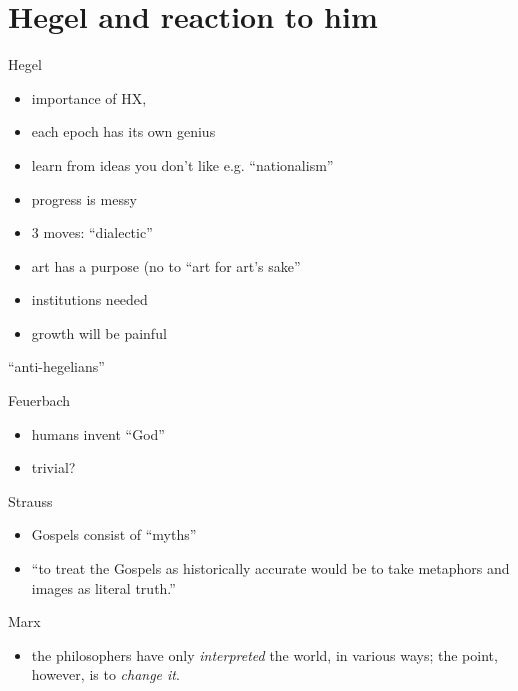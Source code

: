 \section{Hegel and reaction to him}
\label{sec-2}
\begin{frame}[label=sec-2-1]{Hegel}
\begin{itemize}
\item importance of HX,
\item each epoch has its own genius
\item learn from ideas you don't like e.g. ``nationalism''
\item progress is messy
\item 3 moves: ``dialectic''
\item art has a purpose (no to ``art for art's sake''
\item institutions needed
\item growth will be painful
\end{itemize}
\end{frame}
\begin{frame}[label=sec-2-2]{``anti-hegelians''}
\begin{block}{Feuerbach}
\begin{itemize}
\item humans invent ``God''
\item trivial?
\end{itemize}
\end{block}
\begin{block}{Strauss}
\begin{itemize}
\item Gospels consist of ``myths''
\item ``to treat the Gospels as historically accurate would be to take metaphors and images as literal truth.''
\end{itemize}
\end{block}
\begin{block}{Marx}
\begin{itemize}
\item the philosophers have only \emph{interpreted} the world, in various ways; the point, however, is to \emph{change it}.
\end{itemize}
\end{block}
\end{frame}
